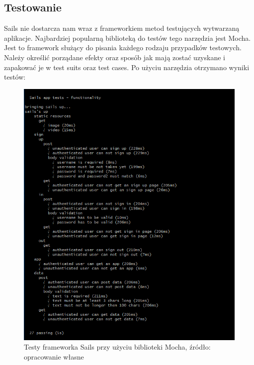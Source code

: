 \documentclass[12pt]{report}
\begin{document}
    \subsection{Testowanie}
      Sails nie dostarcza nam wraz z frameworkiem metod testujących wytwarzaną aplikacje. 
      Najbardziej popularną biblioteką do testów tego narzędzia jest Mocha.
      Jest to framework służący do pisania każdego rodzaju przypadków testowych.
      Należy określić porządane efekty oraz sposób jak mają zostać uzyskane i zapakować je w test suits oraz test cases.
      Po użyciu narzędzia otrzymano wyniki testów:
      \begin{figure}[!hb]
        \centering
        \includegraphics[width=\textwidth,height=\textheight,keepaspectratio]{test_Sails.png} 
        \caption{Testy frameworka Sails przy użyciu biblioteki Mocha, źródło: opracowanie własne}
      \end{figure}
\end{document}
